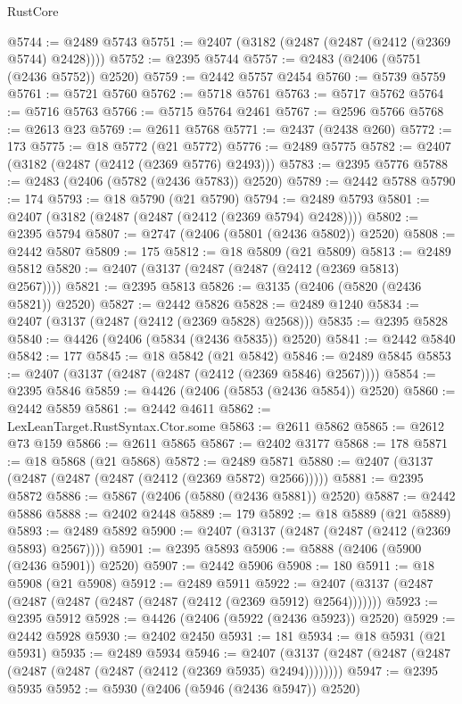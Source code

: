\begin{lexlean}{RustCore}
\begin{coremodule}
@5744 := @2489 @5743
@5751 := @2407 (@3182 (@2487 (@2487 (@2412 (@2369 @5744) @2428))))
@5752 := @2395 @5744
@5757 := @2483 (@2406 (@5751 (@2436 @5752)) @2520)
@5759 := @2442 @5757 @2454
@5760 := @5739 @5759
@5761 := @5721 @5760
@5762 := @5718 @5761
@5763 := @5717 @5762
@5764 := @5716 @5763
@5766 := @5715 @5764 @2461
@5767 := @2596 @5766
@5768 := @2613 @23
@5769 := @2611 @5768
@5771 := @2437 (@2438 @260)
@5772 := 173
@5775 := @18 @5772 (@21 @5772)
@5776 := @2489 @5775
@5782 := @2407 (@3182 (@2487 (@2412 (@2369 @5776) @2493)))
@5783 := @2395 @5776
@5788 := @2483 (@2406 (@5782 (@2436 @5783)) @2520)
@5789 := @2442 @5788
@5790 := 174
@5793 := @18 @5790 (@21 @5790)
@5794 := @2489 @5793
@5801 := @2407 (@3182 (@2487 (@2487 (@2412 (@2369 @5794) @2428))))
@5802 := @2395 @5794
@5807 := @2747 (@2406 (@5801 (@2436 @5802)) @2520)
@5808 := @2442 @5807
@5809 := 175
@5812 := @18 @5809 (@21 @5809)
@5813 := @2489 @5812
@5820 := @2407 (@3137 (@2487 (@2487 (@2412 (@2369 @5813) @2567))))
@5821 := @2395 @5813
@5826 := @3135 (@2406 (@5820 (@2436 @5821)) @2520)
@5827 := @2442 @5826
@5828 := @2489 @1240
@5834 := @2407 (@3137 (@2487 (@2412 (@2369 @5828) @2568)))
@5835 := @2395 @5828
@5840 := @4426 (@2406 (@5834 (@2436 @5835)) @2520)
@5841 := @2442 @5840
@5842 := 177
@5845 := @18 @5842 (@21 @5842)
@5846 := @2489 @5845
@5853 := @2407 (@3137 (@2487 (@2487 (@2412 (@2369 @5846) @2567))))
@5854 := @2395 @5846
@5859 := @4426 (@2406 (@5853 (@2436 @5854)) @2520)
@5860 := @2442 @5859
@5861 := @2442 @4611
@5862 := LexLeanTarget.RustSyntax.Ctor.some
@5863 := @2611 @5862
@5865 := @2612 @73 @159
@5866 := @2611 @5865
@5867 := @2402 @3177
@5868 := 178
@5871 := @18 @5868 (@21 @5868)
@5872 := @2489 @5871
@5880 := @2407 (@3137 (@2487 (@2487 (@2487 (@2412 (@2369 @5872) @2566)))))
@5881 := @2395 @5872
@5886 := @5867 (@2406 (@5880 (@2436 @5881)) @2520)
@5887 := @2442 @5886
@5888 := @2402 @2448
@5889 := 179
@5892 := @18 @5889 (@21 @5889)
@5893 := @2489 @5892
@5900 := @2407 (@3137 (@2487 (@2487 (@2412 (@2369 @5893) @2567))))
@5901 := @2395 @5893
@5906 := @5888 (@2406 (@5900 (@2436 @5901)) @2520)
@5907 := @2442 @5906
@5908 := 180
@5911 := @18 @5908 (@21 @5908)
@5912 := @2489 @5911
@5922 := @2407 (@3137 (@2487 (@2487 (@2487 (@2487 (@2487 (@2412 (@2369 @5912) @2564)))))))
@5923 := @2395 @5912
@5928 := @4426 (@2406 (@5922 (@2436 @5923)) @2520)
@5929 := @2442 @5928
@5930 := @2402 @2450
@5931 := 181
@5934 := @18 @5931 (@21 @5931)
@5935 := @2489 @5934
@5946 := @2407 (@3137 (@2487 (@2487 (@2487 (@2487 (@2487 (@2487 (@2412 (@2369 @5935) @2494))))))))
@5947 := @2395 @5935
@5952 := @5930 (@2406 (@5946 (@2436 @5947)) @2520)

\end{coremodule}
\end{lexlean}

